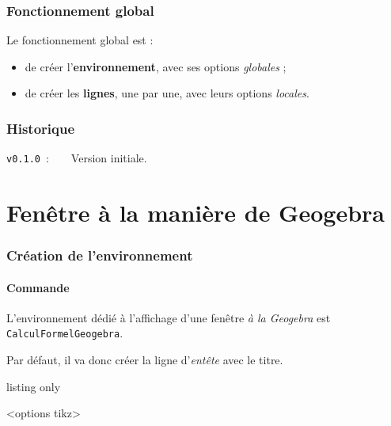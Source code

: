\documentclass[french,a4paper,11pt]{article}
\begin{document}
\section{Fonctionnement global}

\begin{importantblock}
Le fonctionnement global est :

\begin{itemize}
	\item de créer l'\textbf{environnement}, avec ses options \textit{globales} ;
	\item de créer les \textbf{lignes}, une par une, avec leurs options \textit{locales}.
\end{itemize}
\vspace*{-\baselineskip}\leavevmode
\end{importantblock}

\vfill

\section{Historique}

\verb|v0.1.0|~:~~~~Version initiale.

\hspace*{1cm}

\pagebreak

\part{Fenêtre à la manière de Geogebra}

\section{Création de l'environnement}

\subsection{Commande}

\begin{cautionblock}
L'environnement dédié à l'affichage d'une fenêtre \textit{à la Geogebra} est \texttt{CalculFormelGeogebra}.

Par défaut, il va donc créer la ligne d'\textit{entête} avec le titre.
\end{cautionblock}

\begin{PresentationCode}{listing only}
\begin{CalculFormelGeogebra}<options tikz>
\end{CalculFormelGeogebra}
\end{PresentationCode}
\end{document}
